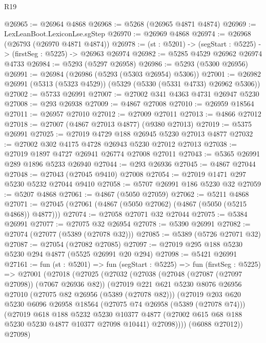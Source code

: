 \begin{lexlean}{R19}
\begin{coremodule}
@26965 := @26964 @4868
@26968 := @5268 (@26965 @4871 @4874)
@26969 := LexLeanBoot.LexiconLse.sgStep
@26970 := @26969 @4868
@26974 := @26968 (@26793 (@26970 @4871 @4874))
@26978 := (st : @5201) -> (segStart : @5225) -> (firstSeg : @5225) -> @26963 @26974
@26982 := @5285 @4529 @26962 @26974 @4733
@26984 := @5293 (@5297 @26958)
@26986 := @5293 (@5300 @26956)
@26991 := @26984 (@26986 (@5293 (@5303 @26954) @5306))
@27001 := @26982 @26991 (@5313 (@5323 @4529)) (@5329 (@5330 (@5331 @4733) @26962 @5306))
@27002 := @5733 @26991
@27007 := @27002 @341 @4363 @4731 @26947 @5230
@27008 := @293 @26938
@27009 := @4867 @27008
@27010 := @26959 @18564
@27011 := @26957 @27010
@27012 := @27009 @27011
@27013 := @4866 @27012
@27018 := @27007 (@4867 @27013 @4877) (@9380 @27013)
@27019 := @5375 @26991
@27025 := @27019 @4729 @188 @26945 @5230 @27013 @4877
@27032 := @27002 @302 @4175 @4728 @26943 @5230 @27012 @27013
@27038 := @27019 @1897 @4727 @26941 @26774 @27008 @27011
@27043 := @5365 @26991 @289 @1896 @5233 @26940
@27044 := @293 @26936
@27045 := @4867 @27044
@27048 := @27043 (@27045 @9410) @27008
@27054 := @27019 @1471 @297 @5230 @5232 @27044 @9410
@27058 := @5707 @26991 @186 @5230 @32
@27059 := @5207 @4868
@27061 := @4867 (@5050 @27059)
@27062 := @5211 @4868
@27071 := @27045 (@27061 (@4867 (@5050 @27062) (@4867 (@5050 (@5215 @4868)) @4877)))
@27074 := @27058 @27071 @32 @27044
@27075 := @5384 @26991
@27077 := @27075 @32 @26954
@27078 := @5390 @26991
@27082 := @27074 (@27077 (@5389 (@27078 @32)))
@27085 := @5389 (@5726 @27071 @32)
@27087 := @27054 (@27082 @27085)
@27097 := @27019 @295 @188 @5230 @5230 @294 @4877 (@5525 @26991 @20 @294)
@27098 := @5421 @26991
@27161 := fun (st : @5201) =>
  fun (segStart : @5225) =>
  fun (firstSeg : @5225) =>
  @27001
    (@27018
      (@27025
        (@27032
          (@27038
            (@27048 (@27087 (@27097 @27098)) (@7067 @26936 @82))
            (@27019
              @221
              @621
              @5230
              @8076
              @26956
              @27010
              (@27075 @82 @26956 (@5389 (@27078 @82)))
              (@27019
                @203
                @620
                @5230
                @6096
                @26958
                @18564
                (@27075 @74 @26958 (@5389 (@27078 @74)))
                (@27019
                  @618
                  @188
                  @5232
                  @5230
                  @10377
                  @4877
                  (@27002 @615 @68 @188 @5230 @5230 @4877 @10377 @27098 @10441)
                  @27098))))
          (@6088 @27012))
        @27098)

\end{coremodule}
\end{lexlean}
